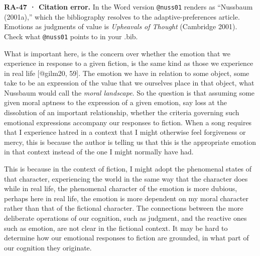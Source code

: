 \documentclass[
  letterpaper,
  DIV=11,
  numbers=noendperiod]{scrartcl}
\theoremstyle{remark}
\begin{document}
\begin{tcolorbox}[enhanced jigsaw, arc=.35mm, bottomrule=.15mm, bottomtitle=1mm, breakable, colback=white, colbacktitle=quarto-callout-warning-color!10!white, colframe=quarto-callout-warning-color-frame, coltitle=black, left=2mm, leftrule=.75mm, opacityback=0, opacitybacktitle=0.6, rightrule=.15mm, title=\textcolor{quarto-callout-warning-color}{\faExclamationTriangle}\hspace{0.5em}{Warning}, titlerule=0mm, toprule=.15mm, toptitle=1mm]

\textbf{RA-47 · Citation error.} In the Word version \texttt{@nuss01}
renders as ``Nussbaum (2001a),'' which the bibliography resolves to the
adaptive-preferences article. Emotions as judgments of value is
\emph{Upheavals of Thought} (Cambridge 2001). Check what
\texttt{@nuss01} points to in your .bib.

\end{tcolorbox}

What is important here, is the concern over whether the emotion that we
experience in response to a given fiction, is the same kind as those we
experience in real life {[}@gilm20, 59{]}. The emotion we have in
relation to some object, some take to be an expression of the value that
we ourselves place in that object, what Nussbaum would call the
\emph{moral landscape}. So the question is that assuming some given
moral aptness to the expression of a given emotion, say loss at the
dissolution of an important relationship, whether the criteria governing
such emotional expressions accompany our responses to fiction. When a
song requires that I experience hatred in a context that I might
otherwise feel forgiveness or mercy, this is because the author is
telling us that this is the appropriate emotion in that context instead
of the one I might normally have had.

This is because in the context of fiction, I might adopt the phenomenal
states of that character, experiencing the world in the same way that
the character does while in real life, the phenomenal character of the
emotion is more dubious, perhaps here in real life, the emotion is more
dependent on my moral character rather than that of the fictional
character. The connections between the more deliberate operations of our
cognition, such as judgment, and the reactive ones such as emotion, are
not clear in the fictional context. It may be hard to determine how our
emotional responses to fiction are grounded, in what part of our
cognition they originate.
\end{document}
